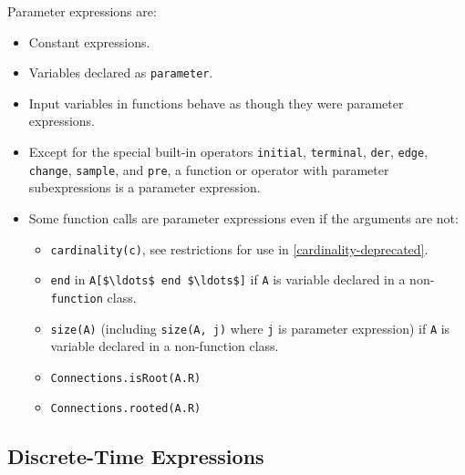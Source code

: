 Parameter expressions are:
\begin{itemize}
\item
  Constant expressions.
\item
  Variables declared as \lstinline!parameter!.
\item
  Input variables in functions behave as though they were parameter expressions.
\item
  Except for the special built-in operators \lstinline!initial!, \lstinline!terminal!, \lstinline!der!,
  \lstinline!edge!, \lstinline!change!, \lstinline!sample!, and \lstinline!pre!, a function or operator with parameter
  subexpressions is a parameter expression.
\item
  Some function calls are parameter expressions even if the arguments are not:
  \begin{itemize}
  \item
    \lstinline!cardinality(c)!, see restrictions for use in \cref{cardinality-deprecated}.
  \item
    \lstinline!end! in \lstinline!A[$\ldots$ end $\ldots$]! if \lstinline!A! is variable declared in a non-\lstinline!function! class.
  \item
    \lstinline!size(A)! (including \lstinline!size(A, j)! where \lstinline!j! is parameter expression) if \lstinline!A! is variable declared in a non-function class.
  \item
    \lstinline!Connections.isRoot(A.R)!
  \item
    \lstinline!Connections.rooted(A.R)!
  \end{itemize}
\end{itemize}

\subsection{Discrete-Time Expressions}\label{discrete-time-expressions}

